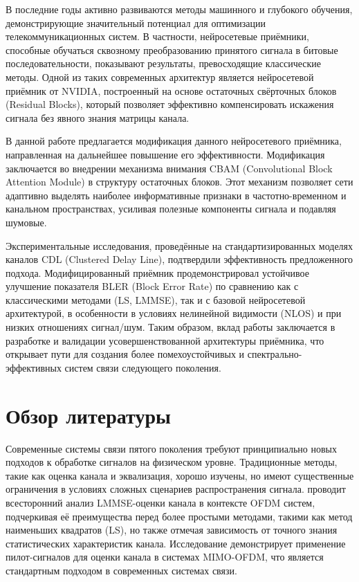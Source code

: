 \documentclass{article}
\begin{document}
В последние годы активно развиваются методы машинного и глубокого обучения, демонстрирующие значительный потенциал для оптимизации телекоммуникационных систем. В частности, нейросетевые приёмники, способные обучаться сквозному преобразованию принятого сигнала в битовые последовательности, показывают результаты, превосходящие классические методы. Одной из таких современных архитектур является нейросетевой приёмник от NVIDIA, построенный на основе остаточных свёрточных блоков (Residual Blocks), который позволяет эффективно компенсировать искажения сигнала без явного знания матрицы канала.

В данной работе предлагается модификация данного нейросетевого приёмника, направленная на дальнейшее повышение его эффективности. Модификация заключается во внедрении механизма внимания CBAM (Convolutional Block Attention Module) в структуру остаточных блоков. Этот механизм позволяет сети адаптивно выделять наиболее информативные признаки в частотно-временном и канальном пространствах, усиливая полезные компоненты сигнала и подавляя шумовые.

Экспериментальные исследования, проведённые на стандартизированных моделях каналов CDL (Clustered Delay Line), подтвердили эффективность предложенного подхода. Модифицированный приёмник продемонстрировал устойчивое улучшение показателя BLER (Block Error Rate) по сравнению как с классическими методами (LS, LMMSE), так и с базовой нейросетевой архитектурой, в особенности в условиях нелинейной видимости (NLOS) и при низких отношениях сигнал/шум. Таким образом, вклад работы заключается в разработке и валидации усовершенствованной архитектуры приёмника, что открывает пути для создания более помехоустойчивых и спектрально-эффективных систем связи следующего поколения.

\section*{Обзор литературы}

Современные системы связи пятого поколения требуют принципиально новых подходов к обработке сигналов на физическом уровне. Традиционные методы, такие как оценка канала и эквализация, хорошо изучены, но имеют существенные ограничения в условиях сложных сценариев распространения сигнала. \citet{badr2019lmmse} проводит всесторонний анализ LMMSE-оценки канала в контексте OFDM систем, подчеркивая её преимущества перед более простыми методами, такими как метод наименьших квадратов (LS), но также отмечая зависимость от точного знания статистических характеристик канала. Исследование \citet{bagadi2010mimo} демонстрирует применение пилот-сигналов для оценки канала в системах MIMO-OFDM, что является стандартным подходом в современных системах связи.
\end{document}
